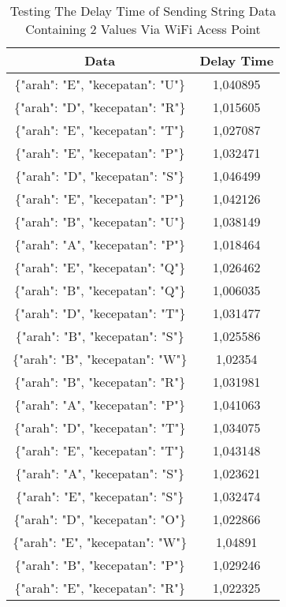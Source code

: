 \begin{table}[!ht]
  \centering
  \caption{Testing The Delay Time of Sending String Data Containing 2 Values Via WiFi Acess Point}
  \label{tbl:delayWiFiJSON}
  \begin{tabular}{|c|c|}
  \hline
  Data                              & Delay Time  \\ \hline
  \{"arah": "E", "kecepatan": "U"\} & 1,040895    \\ \hline
  \{"arah": "D", "kecepatan": "R"\} & 1,015605    \\ \hline
  \{"arah": "E", "kecepatan": "T"\} & 1,027087    \\ \hline
  \{"arah": "E", "kecepatan": "P"\} & 1,032471    \\ \hline
  \{"arah": "D", "kecepatan": "S"\} & 1,046499    \\ \hline
  \{"arah": "E", "kecepatan": "P"\} & 1,042126    \\ \hline
  \{"arah": "B", "kecepatan": "U"\} & 1,038149    \\ \hline
  \{"arah": "A", "kecepatan": "P"\} & 1,018464    \\ \hline
  \{"arah": "E", "kecepatan": "Q"\} & 1,026462    \\ \hline
  \{"arah": "B", "kecepatan": "Q"\} & 1,006035    \\ \hline
  \{"arah": "D", "kecepatan": "T"\} & 1,031477    \\ \hline
  \{"arah": "B", "kecepatan": "S"\} & 1,025586    \\ \hline
  \{"arah": "B", "kecepatan": "W"\} & 1,02354     \\ \hline
  \{"arah": "B", "kecepatan": "R"\} & 1,031981    \\ \hline
  \{"arah": "A", "kecepatan": "P"\} & 1,041063    \\ \hline
  \{"arah": "D", "kecepatan": "T"\} & 1,034075    \\ \hline
  \{"arah": "E", "kecepatan": "T"\} & 1,043148    \\ \hline
  \{"arah": "A", "kecepatan": "S"\} & 1,023621    \\ \hline
  \{"arah": "E", "kecepatan": "S"\} & 1,032474    \\ \hline
  \{"arah": "D", "kecepatan": "O"\} & 1,022866    \\ \hline
  \{"arah": "E", "kecepatan": "W"\} & 1,04891     \\ \hline
  \{"arah": "B", "kecepatan": "P"\} & 1,029246    \\ \hline
  \{"arah": "E", "kecepatan": "R"\} & 1,022325    \\ \hline

\end{tabular}
\end{table}
